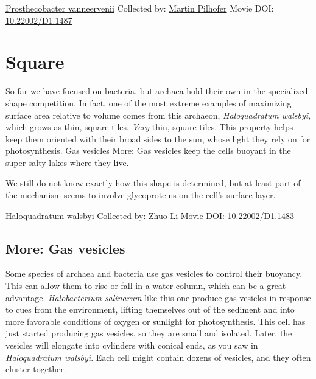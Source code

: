 \documentclass[]{tufte-book}
\begin{document}
\hypertarget{htmlwidget-8adfd3e4d41a8ee0a975}{}

\label{fig:3-6a}\protect\hyperlink{tree}{Prosthecobacter vanneervenii} Collected by: \protect\hyperlink{martin_pilhofer}{Martin Pilhofer} Movie DOI: \href{https://doi.org/10.22002/D1.1487}{10.22002/D1.1487}

\hypertarget{square}{%
\section{Square}\label{square}}

So far we have focused on bacteria, but archaea hold their own in the specialized shape competition. In fact, one of the most extreme examples of maximizing surface area relative to volume comes from this archaeon, \emph{Haloquadratum walsbyi}, which grows as thin, square tiles. \emph{Very} thin, square tiles. This property helps keep them oriented with their broad sides to the sun, whose light they rely on for photosynthesis. Gas vesicles \protect\hyperlink{Gas_vesicles}{More: Gas vesicles} keep the cells buoyant in the super-salty lakes where they live.

We still do not know exactly how this shape is determined, but at least part of the mechanism seems to involve glycoproteins on the cell's surface layer.



\hypertarget{htmlwidget-3d2f571ecf40e0794166}{}

\label{fig:3-7}\protect\hyperlink{tree}{Haloquadratum walsbyi} Collected by: \protect\hyperlink{zhuo_li}{Zhuo Li} Movie DOI: \href{https://doi.org/10.22002/D1.1483}{10.22002/D1.1483}

\hypertarget{Gas_vesicles}{%
\subsection*{More: Gas vesicles}\label{Gas_vesicles}}

Some species of archaea and bacteria use gas vesicles to control their buoyancy. This can allow them to rise or fall in a water column, which can be a great advantage. \emph{Halobacterium salinarum} like this one produce gas vesicles in response to cues from the environment, lifting themselves out of the sediment and into more favorable conditions of oxygen or sunlight for photosynthesis. This cell has just started producing gas vesicles, so they are small and isolated. Later, the vesicles will elongate into cylinders with conical ends, as you saw in \emph{Haloquadratum walsbyi}. Each cell might contain dozens of vesicles, and they often cluster together.
\end{document}
